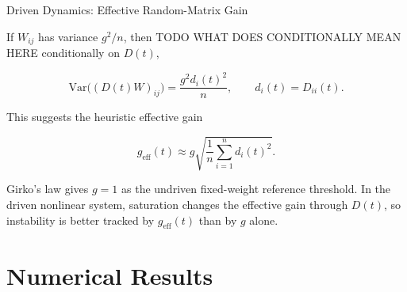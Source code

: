 \documentclass[
11pt,notheorems,hyperref={pdfauthor=whatever}
]{beamer}
\begin{document}
\begin{frame}{Driven Dynamics: Effective Random-Matrix Gain}
\small

If \(W_{ij}\) has variance \(g^2/n\), then TODO WHAT DOES CONDITIONALLY MEAN HERE conditionally on \(D(t)\),

\[
\mathrm{Var}\big((D(t)W)_{ij}\big)
=
\frac{g^2 d_i(t)^2}{n},
\qquad
d_i(t)=D_{ii}(t).
\]

This suggests the heuristic effective gain

\[
g_{\mathrm{eff}}(t)
\approx
g
\sqrt{
\frac{1}{n}\sum_{i=1}^n d_i(t)^2
}.
\]

Girko's law gives \(g=1\) as the undriven fixed-weight reference threshold.
In the driven nonlinear system, saturation changes the effective gain through
\(D(t)\), so instability is better tracked by \(g_{\mathrm{eff}}(t)\) than by
\(g\) alone.

\end{frame}



\section{Numerical Results}
\end{document}
